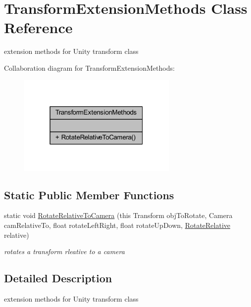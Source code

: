 \hypertarget{class_transform_extension_methods}{}\section{Transform\+Extension\+Methods Class Reference}
\label{class_transform_extension_methods}


extension methods for Unity transform class  




Collaboration diagram for Transform\+Extension\+Methods\+:\nopagebreak
\begin{figure}[H]
\begin{center}
\leavevmode
\includegraphics[width=220pt]{class_transform_extension_methods__coll__graph}
\end{center}
\end{figure}
\subsection*{Static Public Member Functions}
\begin{DoxyCompactItemize}
\item 
static void \mbox{\hyperlink{class_transform_extension_methods_ad6c9459ef6c2fd963fb1145f11c839a3}{Rotate\+Relative\+To\+Camera}} (this Transform obj\+To\+Rotate, Camera cam\+Relative\+To, float rotate\+Left\+Right, float rotate\+Up\+Down, \mbox{\hyperlink{_transform_extension_methods_8cs_a6652dfee9c8aeffcd5b5858801e16ca4}{Rotate\+Relative}} relative)
\begin{DoxyCompactList}\small\item\em rotates a transform rleative to a camera \end{DoxyCompactList}\end{DoxyCompactItemize}


\subsection{Detailed Description}
extension methods for Unity transform class 



